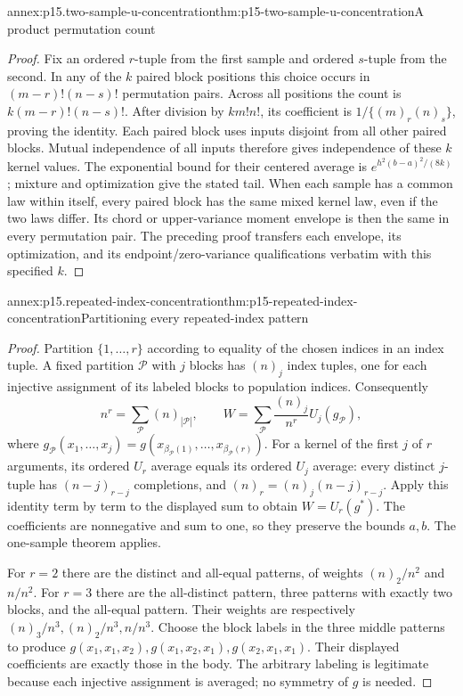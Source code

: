 \begin{annexitem}{annex:p15.two-sample-u-concentration}{thm:p15-two-sample-u-concentration}{A product permutation count}
\begin{proof}
Fix an ordered \(r\)-tuple from the first sample and ordered \(s\)-tuple
from the second. In any of the \(k\) paired block positions this choice
occurs in \((m-r)!(n-s)!\) permutation pairs. Across all positions the
count is \(k(m-r)!(n-s)!\). After division by \(k m!n!\), its coefficient is
\(1/\{(m)_r(n)_s\}\), proving the identity.
Each paired block uses inputs disjoint from all other paired blocks.
Mutual independence of all inputs therefore gives independence of
these \(k\) kernel values.
The exponential bound for their centered average is
\(e^{h^2(b-a)^2/(8k)}\); mixture and optimization give the stated tail.
When each sample has a common law within itself, every paired block
has the same mixed kernel law, even if the two laws differ.
Its chord or upper-variance moment envelope is then the same in
every permutation pair. The preceding proof transfers each envelope,
its optimization, and its endpoint/zero-variance qualifications verbatim
with this specified \(k\).
\end{proof}
\end{annexitem}

\begin{annexitem}{annex:p15.repeated-index-concentration}{thm:p15-repeated-index-concentration}{Partitioning every repeated-index pattern}
\begin{proof}
Partition \(\{1,\ldots,r\}\) according to equality of the chosen indices
in an index tuple. A fixed partition \(\mathcal P\) with \(j\) blocks
has \((n)_j\) index tuples, one for each injective assignment of its
labeled blocks to population indices. Consequently
\[
 n^r=\sum_{\mathcal P}(n)_{|\mathcal P|},\qquad
 W=\sum_{\mathcal P}\frac{(n)_j}{n^r}U_j(g_{\mathcal P}),
\]
where
\(g_{\mathcal P}(x_1,\ldots,x_j)
 =g(x_{\beta_{\mathcal P}(1)},\ldots,x_{\beta_{\mathcal P}(r)})\).
For a kernel of the first \(j\) of \(r\) arguments, its ordered
\(U_r\) average equals its ordered \(U_j\) average: every distinct
\(j\)-tuple has \((n-j)_{r-j}\) completions, and
\((n)_r=(n)_j(n-j)_{r-j}\).
Apply this identity term by term to the displayed sum to obtain
\(W=U_r(g^*)\). The coefficients are nonnegative and sum to one,
so they preserve the bounds \(a,b\). The one-sample theorem applies.

For \(r=2\) there are the distinct and all-equal patterns, of weights
\((n)_2/n^2\) and \(n/n^2\). For \(r=3\) there are the all-distinct
pattern, three patterns with exactly two blocks, and the all-equal
pattern. Their weights are respectively
\((n)_3/n^3,(n)_2/n^3,n/n^3\).
Choose the block labels in the three middle patterns to produce
\(g(x_1,x_1,x_2),g(x_1,x_2,x_1),g(x_2,x_1,x_1)\).
Their displayed coefficients are exactly those in the body.
The arbitrary labeling is legitimate because each injective assignment
is averaged; no symmetry of \(g\) is needed.
\end{proof}
\end{annexitem}

